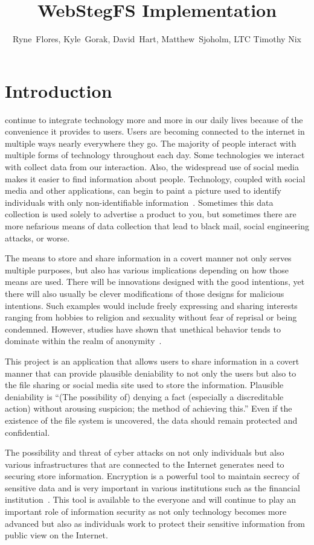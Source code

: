 \documentclass[12pt,journal,compsoc]{IEEEtran}
\title{WebStegFS Implementation}
\author{Ryne~Flores, Kyle~Gorak, David~Hart, Matthew~Sjoholm, LTC Timothy Nix \\ \IEEEmembership{Department of Electrical Engineering and Computer Science\\ United States Military Academy}}
\date{}
\begin{document}
\maketitle

\section{Introduction}

 continue to integrate technology more and more in our daily lives because of the convenience it provides to users. Users are becoming connected to the internet in multiple ways nearly everywhere they go. The majority of people interact with multiple forms of technology throughout each day. Some technologies we interact with collect data from our interaction. Also, the widespread use of social media makes it easier to find information about people. Technology, coupled with social media and other applications, can begin to paint a picture used to identify individuals with only non-identifiable information~\cite{VanDam2015}. Sometimes this data collection is used solely to advertise a product to you, but sometimes there are more nefarious means of data collection that lead to black mail, social engineering attacks, or worse. 

The means to store and share information in a covert manner not only serves multiple purposes, but also has various implications depending on how those means are used. There will be innovations designed with the good intentions, yet there will also usually be clever modifications of those designs for malicious intentions. Such examples would include freely expressing and sharing interests ranging from hobbies to religion and sexuality without fear of reprisal or being condemned. However, studies have shown that unethical behavior tends to dominate within the realm of anonymity~\cite{Guitton2013}.

This project is an application that allows users to share information in a covert manner that can provide plausible deniability to not only the users but also to the file sharing or social media site used to store the information. Plausible deniability is ``(The possibility of) denying a fact (especially a discreditable action) without arousing suspicion; the method of achieving this.''\cite{OxfordDictionary} Even if the existence of the file system is uncovered, the data should remain protected and confidential.  

The possibility and threat of cyber attacks on not only individuals but also various infrastructures that are connected to the Internet generates need to securing store information. Encryption is a powerful tool to maintain secrecy of sensitive data and is very important in various institutions such as the financial institution~\cite{Grover2004}. This tool is available to the everyone and will continue to play an important role of information security as not only technology becomes more advanced but also as individuals work to protect their sensitive information from public view on the Internet.
\end{document}

